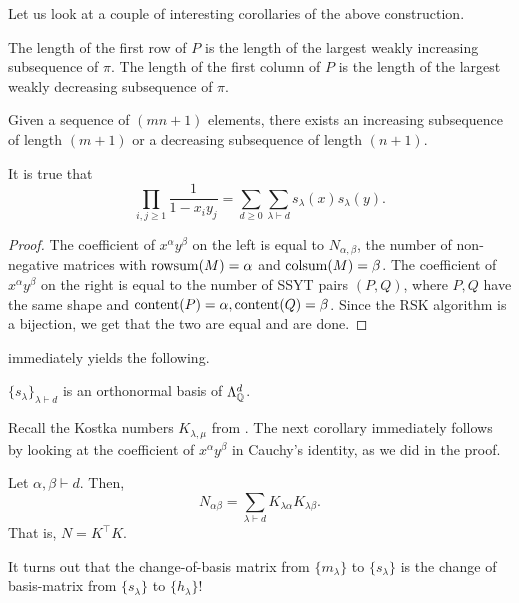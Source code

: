 	Let us look at a couple of interesting corollaries of the above construction.
	\begin{theorem}[Schenstead]
		The length of the first row of $P$ is the length of the largest weakly increasing subsequence of $\pi$. The length of the first column of $P$ is the length of the largest weakly decreasing subsequence of $\pi$.
	\end{theorem}

	\begin{fcor}
		Given a sequence of $(mn+1)$ elements, there exists an increasing subsequence of length $(m+1)$ or a decreasing subsequence of length $(n+1)$.
	\end{fcor}

	\begin{fcor}
		It is true that
		\[ \prod_{i,j \ge 1} \frac{1}{1-x_iy_j} = \sum_{d \ge 0} \sum_{\lambda \vdash d} s_\lambda(x) s_\lambda(y). \]
	\end{fcor}

	\begin{proof}
		The coefficient of $x^\alpha y^\beta$ on the left is equal to $N_{\alpha,\beta}$, the number of non-negative matrices with $\operatorname{rowsum}(M) = \alpha$ and $\operatorname{colsum}(M) = \beta$.  The coefficient of $x^\alpha y^\beta$ on the right is equal to the number of SSYT pairs $(P,Q)$, where $P,Q$ have the same shape and $\operatorname{content}(P) = \alpha, \operatorname{content}(Q) = \beta$. Since the RSK algorithm is a bijection, we get that the two are equal and are done.
	\end{proof}

	 immediately yields the following.

	\begin{fcor}
		$\{s_\lambda\}_{\lambda \vdash d}$ is an orthonormal basis of $\Lambda^d_{\mathbb{Q}}$.
	\end{fcor}

	Recall the Kostka numbers $K_{\lambda,\mu}$ from . The next corollary immediately follows by looking at the coefficient of $x^\alpha y^\beta$ in Cauchy's identity, as we did in the proof.

	\begin{fcor}
		Let $\alpha,\beta \vdash d$. Then,
		\[ N_{\alpha\beta} = \sum_{\lambda \vdash d} K_{\lambda\alpha} K_{\lambda \beta}. \]
		That is, $N = K^\top K$.
	\end{fcor}

	It turns out that the change-of-basis matrix from $\{m_\lambda\}$ to $\{s_\lambda\}$ is the change of basis-matrix from $\{s_\lambda\}$ to $\{h_\lambda\}$!

